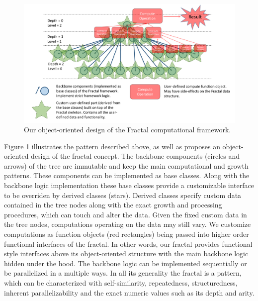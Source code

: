 \begin{figure}[!htb]
\includegraphics[width=1.0\textwidth]{images/Fractal.pdf}
\caption{Our object-oriented design of the Fractal computational framework.}
\label{fig:fractal_scheme}
\end{figure}
Figure \ref{fig:fractal_scheme} illustrates the pattern described above, as well as proposes an object-oriented design of the fractal concept. The backbone components (circles and arrows) of the tree are immutable and keep the main computational and growth patterns. These components can be implemented as base classes. Along with the backbone logic implementation these base classes provide a customizable interface to be overriden by derived classes (stars). Derived classes specify custom data contained in the tree nodes along with the exact growth and processing procedures, which can touch and alter the data. Given the fixed custom data in the tree nodes, computations operating on the data may still vary. We customize computations as function objects (red rectangles) being passed into higher order functional interfaces of the fractal. In other words, our fractal provides functional style interfaces above its object-oriented structure with the main backbone logic hidden under the hood. The backbone logic can be implemented sequentially or be parallelized in a multiple ways. In all its generality the fractal is a pattern, which can be characterized with self-similarity, repeatedness, structuredness, inherent parallelizability and the exact numeric values such as its depth and arity.
